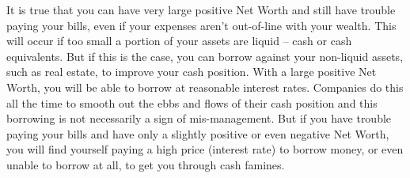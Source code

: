\documentclass{report}
\begin{document}
It is true that you can have very large positive Net Worth and still have trouble paying your bills, even if your expenses aren't out-of-line with your wealth. This will occur if too small a portion of your assets are liquid -- cash or cash equivalents. But if this is the case, you can borrow against your non-liquid assets, such as real estate, to improve your cash position. With a large positive Net Worth, you will be able to borrow at reasonable interest rates. Companies do this all the time to smooth out the ebbs and flows of their cash position and this borrowing is not necessarily a sign of mis-management. But if you have trouble paying your bills and have only a slightly positive or even negative Net Worth, you will find yourself paying a high price (interest rate) to borrow money, or even unable to borrow at all, to get you through cash famines. 
\end{document}
